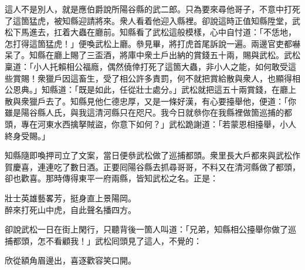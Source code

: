 這人不是別人，就是應伯爵說所陽谷縣的武二郎。只為要來尋他哥子，不意中打死了這箇猛虎，被知縣迎請將來。衆人看着他迎入縣裡。卻說這時正值知縣陞堂，武松下馬進去，扛着大蟲在廳前。知縣看了武松這般模樣，心中自忖道：「不恁地，怎打得這箇猛虎！」便喚武松上廳。叅見畢，將打虎首尾訴說一遍。兩邊官吏都嚇呆了。知縣在廳上賜了三盃酒，將庫中衆土戶出納的賞錢五十兩，賜與武松。武松稟道：「小人托賴相公福廕，偶然僥倖打死了這箇大蟲，非小人之能，如何敢受這些賞賜！衆獵戶因這畜生，受了相公許多責罰，何不就把賞給散與衆人，也顯得相公恩典。」{}知縣道：「既是如此，任從壯士處分。」武松就把這五十兩賞錢，在廳上散與衆獵戶去了。知縣見他仁德忠厚，又是一條好漢，有心要擡舉他，便道：「你雖是陽谷縣人氏，與我這清河縣只在咫尺。我今日就叅你在我縣裡做箇巡捕的都頭，專在河東水西擒拏賊盜，你意下如何？」武松跪謝道：「若蒙恩相擡舉，小人終身受賜。」

知縣隨即喚押司立了文案，當日便叅武松做了巡捕都頭。衆里長大戶都來與武松作賀慶喜，連連吃了數日酒。正要囘陽谷縣去抓尋哥哥，不料又在清河縣做了都頭，卻也歡喜。那時傳得東平一府兩縣，皆知武松之名。正是：

\begin{myquote}
壯士英雄藝畧芳，挺身直上景陽岡。\\
醉來打死山中虎，自此聲名播四方。
\end{myquote}

卻說武松一日在街上閑行，只聽背後一箇人叫道：「兄弟，知縣相公擡舉你做了巡捕都頭，怎不看顧我！」武松囘頭見了這人，不覺的：

\begin{myquote}
欣從額角眉邊出，喜逐歡容笑口開。
\end{myquote}

